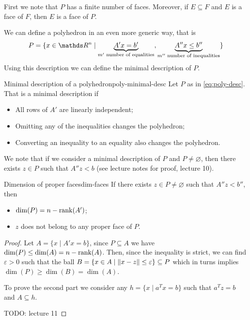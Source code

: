 \documentclass[12pt]{extarticle}
\begin{document}
First we note that $P$ has a finite number of faces.
Moreover, if $E \subseteq F$ and $E$ is a face of $F$, then $E$ is a face of $P$.

We can define a polyhedron in an even more generic way, that is
\begin{equation}
	P = \{ x \in \R^n \mid \underbrace{A'x = b'}_{m' \text{ number of equalities}},
	\underbrace{A '' x \leq b''}_{m'' \text{ number of inequalities}} \}
	\label{eq:poly-desc}
\end{equation}
Using this description we can define the minimal description of $P$.
\begin{definition}{Minimal description of a polyhedron}{poly-minimal-desc}
	Let $P$ as in \cref{eq:poly-desc}.
	That is a minimal description if
	\begin{itemize}
		\item All rows of $A'$ are linearly independent;
		\item Omitting any of the inequalities changes the polyhedron;
		\item Converting an inequality to	an equality also changes the polyhedron.
	\end{itemize}
\end{definition}

We note that if we consider a minimal description of $P$ and $P \neq \varnothing$,
then there exists $z \in P$ such that $A''z < b$ (see lecture notes for proof, lecture 10).

\begin{lemma}{Dimension of proper faces}{dim-faces}
	If there exists $z \in P \neq \varnothing$ such that $A'' z<b''$, then
	\begin{itemize}
		\item $\mathrm{dim}(P) = n - \rank(A')$;
		\item $z$ does not belong to any proper face of $P$.
	\end{itemize}
\end{lemma}

\begin{proof}
	Let $A = \{ x \mid A'x = b\}$, since $P \subseteq A$ we have
	$\dim(P) \leq \dim(A) = n - \rank(A)$.
	Then, since the inequality is strict, we can find $\varepsilon > 0$ such that the ball
	$B = \{ x \in A \mid \norm{x - z} \leq \varepsilon \} \subseteq P$ which in turns implies
	$\dim(P) \geq \dim(B) = \dim(A)$.

	To prove the second part we consider any $h = \{x \mid a^T x = b\}$ such that $a^T z = b$
	and $A \subseteq h$.

	TODO: lecture 11
\end{proof}
\end{document}
